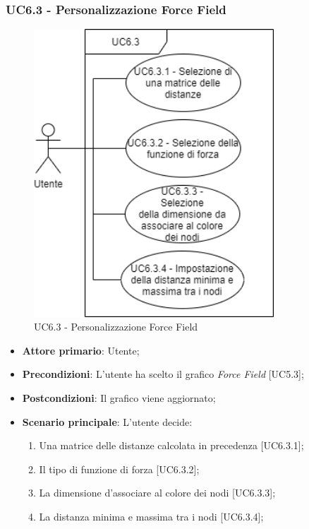 \subsubsection{UC6.3 - Personalizzazione Force Field}
\begin{figure}[h]
\includegraphics[width=9cm]{Section/Images/UC6.3.png}
\centering
\caption{UC6.3 - Personalizzazione Force Field}
\end{figure}
\begin{itemize}
	\item \textbf{Attore primario}: Utente;
	
	\item \textbf{Precondizioni}: L'utente ha scelto il grafico \textit{Force Field} [UC5.3];
	
	\item \textbf{Postcondizioni}: Il grafico viene aggiornato;
	
	\item \textbf{Scenario principale}: L'utente decide:
	
\begin{enumerate}
\item Una matrice delle distanze calcolata in precedenza [UC6.3.1];
\item Il tipo di funzione di forza [UC6.3.2];
\item La dimensione d'associare al colore dei nodi [UC6.3.3];
\item La distanza minima e massima tra i nodi [UC6.3.4];
\end{enumerate}	
		
\end{itemize}

